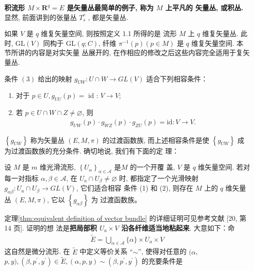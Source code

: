 \textbf{积流形 $M \times \boldsymbol{R}^q=E$ 是矢量丛最简单的例子, 称为 $M$ 上平凡的 矢量丛, 或积丛. }显然, 前面讲到的张量丛 $T^r_s$ ,  都是矢量丛.

\begin{remark}
    如果 $V$ 是 $q$ 维复矢量空间, 则按照定义 1.1 所得的是 流形 $M$ 上 $q$ 维复矢量丛. 此时, $\mathrm{GL}(V)$ 同构于 $\mathrm{GL}(q ; C)$, 纤维
$\pi^{-1}(p)(p \in M)$ 是 $q$ 维复矢量空间. 本节所讲的内容是对实矢量 丛展开的, 在作相应的修改之后这些内容完全适用于复矢量丛.
\end{remark}

条件 $(3)$ 给出的映射 $g_{U W}: U \cap W \rightarrow G L(V)$ 适合下列相容条件：
\begin{enumerate}
    \item 对于 $p \in U, g_{U U}(p)=$ id : $V \rightarrow V$;
    \item 若 $p \in U \cap W \cap Z \neq \varnothing$, 则
\begin{align*}
g_{U W}(p) \cdot g_{W Z}(p) \cdot g_{Z U}(p)=\mathrm{id}: V \rightarrow V .
\end{align*}
\end{enumerate}

$\left\{g_{U W}\right\}$ 称为矢量丛 $(E, M, \pi)$ 的过渡函数族, 而上述相容条件是使 $\left\{g_{UW}\right\}$ 成为过渡函数族的充分条件. 确切地说, 我们有下面的定 理：

\begin{theorem}
    设 $M$ 是 $m$ 维光滑流形, $\left\{U_\alpha\right\}_{\alpha \in\mathscr{A}}$ 是$M$ 的一个开覆 盖, $V$ 是 $q$ 维矢量空间. 若对每一对指标 $\alpha, \beta \in \mathscr{A}$, 在 $U_a \cap U_\beta \neq \varnothing$ 时, 都指定了一个光滑映射 $g_{\alpha \beta}: U_a \cap U_\beta \rightarrow G L(V)$, 它们适合相容 条件 (1) 和 (2), 则存在 $M$ 上的 $q$ 维矢量丛 $(E, M, \pi)$, 它以 $\left\{g_{\alpha\beta}\right\}$ 为 过渡函数族。
\end{theorem}

定理\ref{thm:equivalent definition of vector bundle} 的详细证明可见参考文献 [20, 第 14 页]. 证明的想 法是\textbf{把局部积 $U_a \times V$ 沿各纤维适当地粘起来}. 大意如下：命
\begin{align*}
\widetilde{E}=\bigcup_{\alpha \in \mathscr{A}}\{\alpha\} \times U_a \times V
\end{align*}
这自然是微分流形. 在 $\widetilde{E}$ 中定义等价关系 ``$\sim$'', 使得对任意的 $(\alpha$, $p, y),\left(\beta, p^{\prime}, y^{\prime}\right) \in \widetilde{E},(\alpha, p, y) \sim\left(\beta, p^{\prime}, y^{\prime}\right)$ 的充要条件是

